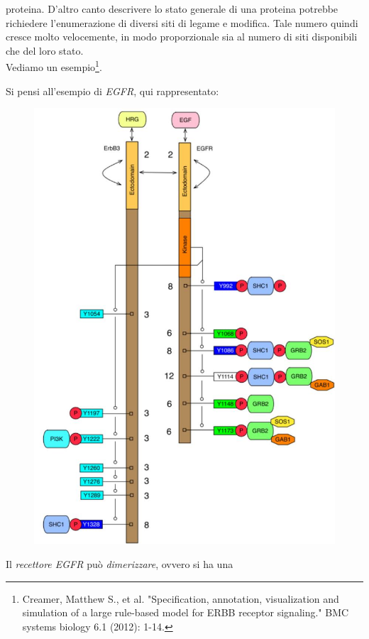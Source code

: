 \documentclass[a4paper,12pt, oneside]{book}
\begin{document}
proteina. D'altro canto descrivere lo stato generale di una proteina potrebbe
richiedere l'enumerazione di diversi siti di legame e modifica. Tale numero
quindi cresce molto velocemente, in modo proporzionale sia al numero di siti
disponibili che del loro stato.\\
Vediamo un esempio\footnote{Creamer, Matthew S., et al. "Specification,
  annotation, visualization and simulation of a large rule-based model for ERBB
  receptor signaling." BMC systems biology 6.1 (2012): 1-14.}. 
\begin{esempio}
  Si pensi all'esempio di \textit{EGFR}, qui rappresentato:
  \begin{figure}[H]
    \centering
    \includegraphics[scale = 0.3]{img/egfr.jpg}
  \end{figure}
  Il \textit{recettore EGFR} può \textit{dimerizzare}, ovvero si ha  una

\end{esempio}
\end{document}
